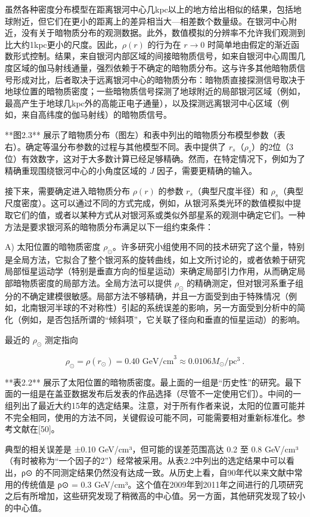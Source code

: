 虽然各种密度分布模型在距离银河中心几kpc以上的地方给出相似的结果，包括地球附近，但它们在更小的距离上的差异相当大—相差数个数量级。在银河中心附近，没有关于暗物质分布的观测数据。此外，数值模拟的分辨率不允许我们观测到比大约1kpc更小的尺度。因此，\( \rho(r) \) 的行为在 \( r \to 0 \) 时简单地由假定的渐近函数形式控制。结果，来自银河内部区域的间接暗物质信号，如来自银河中心周围几度区域的伽马射线通量，强烈依赖于不确定的暗物质分布。这与许多其他暗物质信号形成对比，后者取决于远离银河中心的暗物质分布：暗物质直接探测信号取决于地球位置的暗物质密度；一些暗物质信号探测了地球附近的局部银河区域（例如，最高产生于地球几kpc外的高能正电子通量），以及探测远离银河中心区域（例如，来自高纬度的伽马射线）的暗物质信号。

**图2.3** 展示了暗物质分布（图左）和表中列出的暗物质分布模型参数（表右）。确定等温分布参数的过程与其他模型不同。表中提供了 \( r_s \)（\( \rho_s \)）的2位（3位）有效数字，这对于大多数计算已经足够精确。然而，在特定情况下，例如为了精确重现围绕银河中心的小角度区域的 \( J \) 因子，需要更精确的输入。

接下来，需要确定进入暗物质分布 \( \rho(r) \) 的参数 \( r_s \)（典型尺度半径）和 \( \rho_s \)（典型尺度密度）。这可以通过不同的方式完成，例如，从银河系类光环的数值模拟中提取它们的值，或者以某种方式从对银河系或类似外部星系的观测中确定它们。一种方法是要求银河系的暗物质分布满足以下一组约束条件：

A) 太阳位置的暗物质密度 \( \rho_\odot \)。许多研究小组使用不同的技术研究了这个量，特别是全局方法，它拟合了整个银河系的旋转曲线，如上文所讨论的，或者依赖于研究局部恒星运动学（特别是垂直方向的恒星运动）来确定局部引力作用，从而确定局部暗物质密度的局部方法。全局方法可以提供 \( \rho_\odot \) 的精确测定，但对银河系重子组分的不确定建模很敏感。局部方法不够精确，并且一方面受到由于特殊情况（例如，北南银河半球的不对称性）引起的系统误差的影响，另一方面受到分析中的简化（例如，是否包括所谓的“倾斜项”，它关联了径向和垂直的恒星运动）的影响。

最近的 \( \rho_\odot \) 测定指向

\[ \rho_\odot = \rho(r_\odot) = 0.40 \text{ GeV/cm}^3 \approx 0.0106 M_\odot/\text{pc}^3 ~. \]

**表2.2** 展示了太阳位置的暗物质密度。最上面的一组是“历史性”的研究。最下面的一组是在盖亚数据发布后发表的作品选择（尽管不一定使用它们）。中间的一组列出了最近大约15年的选定结果。注意，对于所有作者来说，太阳的位置可能并不完全相同，使用的方法不同，关键假设可能不同，可能需要相对重新标准化。参考文献在[50]。

典型的相关误差是 ±0.10 GeV/cm³，但可能的误差范围高达 0.2 至 0.8 GeV/cm³（有时被称为“一个因子的2”）经常被采用。从表2.2中列出的选定结果中可以看出，ρ⊙ 的不同测定结果仍然没有达成一致。从历史上看，自90年代以来文献中常用的传统值是 ρ⊙ = 0.3 GeV/cm³。这个值在2009年到2011年之间进行的几项研究之后有所增加，这些研究发现了稍微高的中心值。另一方面，其他研究发现了较小的中心值。

